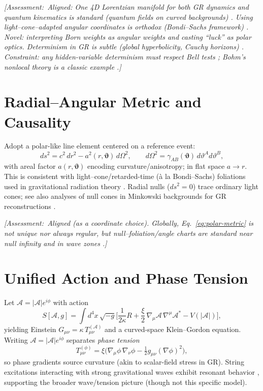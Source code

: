 \documentclass[reprint,amsmath,amssymb,aps]{revtex4-2}
\newcommand{\g}{g}                             %
\newcommand{\A}{\mathcal{A}}                   %
\newcommand{\T}{T}                             %
\newcommand{\ang}{\vartheta}                   %
\newcommand{\angb}{\boldsymbol{\vartheta}}     %
\newcommand{\grad}{\nabla}                     %
\newcommand{\Assessment}[1]{\par\smallskip\noindent\textit{\color{blue}[Assessment:\ #1]}\par\smallskip}
\begin{document}
\Assessment{Aligned: One 4D Lorentzian manifold for both GR dynamics and quantum kinematics is standard (quantum fields on curved backgrounds) \cite{BirrellDavies,ParkerToms}. Using light--cone--adapted angular coordinates is orthodox (Bondi--Sachs framework) \cite{Bondi1962,Sachs1962}. Novel: interpreting Born weights as \emph{angular} weights and casting ``luck'' as polar optics. Determinism in GR is subtle (global hyperbolicity, Cauchy horizons) \cite{SmeenkWuthrich2021}. Constraint: any hidden-variable determinism must respect Bell tests \cite{Hensen2015,Giustina2015,Shalm2015}; Bohm’s nonlocal theory is a classic example \cite{Bohm1952}.}

\section{Radial--Angular Metric and Causality}
Adopt a polar-like line element centered on a reference event:
\begin{equation}
  ds^2 = c^2\,dr^2 - a^2(r,\angb)\,d\Omega^2, 
  \qquad d\Omega^2 = \gamma_{AB}(\angb)\,d\ang^A d\ang^B,
  \label{eq:polar-metric}
\end{equation}
with areal factor $a(r,\angb)$ encoding curvature/anisotropy; in flat space $a\to r$. This is consistent with light--cone/retarded-time (\`a la Bondi--Sachs) foliations used in gravitational radiation theory \cite{Bondi1962,Sachs1962}. Radial nulls ($ds^2=0$) trace ordinary light cones; see also analyses of null cones in Minkowski backgrounds for GR reconstructions \cite{PittsSchieve2004}.

\Assessment{Aligned (as a coordinate choice). Globally, Eq.~\eqref{eq:polar-metric} is not unique nor always regular, but null--foliation/angle charts are standard near null infinity and in wave zones \cite{Will2014}.}

\section{Unified Action and Phase Tension}
Let $\A=|\A|e^{i\phi}$ with action
\begin{equation}
  S[\A,\g] = \int d^4x\,\sqrt{-g}\Big[\frac{1}{2\kappa}R
    + \frac{\xi}{2}\,\grad_\mu \A\,\grad^\mu \A^* - V(|\A|)
    \Big],
  \label{eq:unified-action}
\end{equation}
yielding Einstein $G_{\mu\nu}=\kappa\, \T_{\mu\nu}^{(\A)}$ and a curved-space Klein--Gordon equation. Writing $\A=|\A|e^{i\phi}$ separates \emph{phase tension}
\begin{equation}
  \T_{\mu\nu}^{(\phi)} = \xi \Big(\grad_\mu \phi\,\grad_\nu \phi - \tfrac{1}{2} g_{\mu\nu} (\grad\phi)^2 \Big),
  \label{eq:phase-tension}
\end{equation}
so phase gradients source curvature (akin to scalar-field stress in GR). String excitations interacting with strong gravitational waves exhibit resonant behavior \cite{LiskaUnge2022}, supporting the broader wave/tension picture (though not this specific model).
\end{document}

